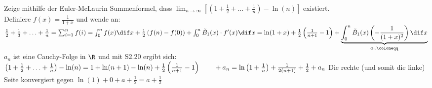 \begin{example}
	Zeige mithilfe der Euler-McLaurin Summenformel, dass $\lim_{n \to \infty}\left[ \left( 1 + \frac{1}{2} + \ldots + \frac{1}{n} \right) - \ln(n) \right]$ existiert.\\
	Definiere $f(x) = \frac{1}{1+x}$ und wende an:\\
    $\frac{1}{2} + \frac{1}{3} + \ldots + \frac{1}{n}  = \sum^{n}_{i=1} f(i)\\
		= \int_{0}^{n} f(x) \dif x + \frac{1}{2} \left( f(n) - f(0) \right) + \int_{0}^{n} \tilde{B}_1(x) \cdot f'(x) \dif x \\
		= \ln(1+x) + \frac{1}{2} \left( \frac{1}{n+1} -1 \right) + \underbrace{\int_{0}^{n} \tilde{B}_1 (x) \left( - \frac{1}{(1+x)^2}  \right) \dif x}_{a_n \coloneqq}$\\
	$a_n$ ist eine Cauchy-Folge in $\R$ und mit S2.20 ergibt sich:\\
    $\left( 1 + \frac{1}{2} + \ldots + \frac{1}{n} \right) - \ln(n) = 1 + \ln(n+1) - \ln(n) + \frac{1}{2}  \left( \frac{1}{n+1} -1 \right)\\ 
									        \qquad + a_n\\
									    = \ln \left( 1 + \frac{1}{n} \right) + \frac{1}{2(n+1)} + \frac{1}{2} + a_n$
	Die rechte (und somit die linke) Seite konvergiert gegen $\ln (1) + 0 + a + \frac{1}{2} = a + \frac{1}{2}$
\end{example}